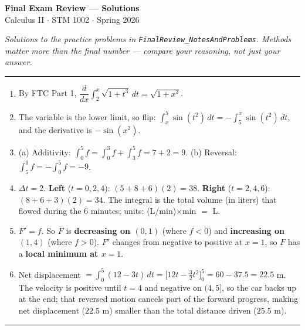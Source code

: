 \documentclass[11pt]{article}
\newcommand{\strand}[1]{%
  \vspace{0.7em}%
  \noindent{\large\textbf{\textcolor{secblue}{#1}}}\par\vspace{0.2em}%
  \noindent\rule{\textwidth}{0.3pt}\par%
}
\begin{document}
\begin{center}
{\LARGE \textbf{Final Exam Review --- Solutions}}\\[4pt]
{\large Calculus II $\cdot$ STM 1002 $\cdot$ Spring 2026}
\end{center}

\noindent\textit{Solutions to the practice problems in \texttt{FinalReview\_NotesAndProblems}. Methods matter more than the final number --- compare your reasoning, not just your answer.}

\strand{1.\quad Accumulation \& the FTC}

\begin{enumerate}[leftmargin=2em, itemsep=0.6em]
\item By FTC Part 1, $\dfrac{d}{dx}\displaystyle\int_2^{x}\sqrt{1+t^3}\,dt = \sqrt{1+x^3}$.

\item The variable is the lower limit, so flip: $\displaystyle\int_{x}^{5}\sin(t^2)\,dt = -\int_5^x \sin(t^2)\,dt$, and the derivative is $-\sin(x^2)$.

\item (a) Additivity: $\displaystyle\int_0^5 f = \int_0^3 f + \int_3^5 f = 7 + 2 = 9$. \;(b) Reversal: $\displaystyle\int_5^0 f = -\int_0^5 f = -9$.

\item $\Delta t = 2$. \;\textbf{Left} ($t=0,2,4$): $(5+8+6)(2) = 38$. \;\textbf{Right} ($t=2,4,6$): $(8+6+3)(2) = 34$. The integral is the total volume (in liters) that flowed during the 6 minutes; units: (L/min)$\times$min $=$ L.

\item $F' = f$. So $F$ is \textbf{decreasing on $(0,1)$} (where $f<0$) and \textbf{increasing on $(1,4)$} (where $f>0$). $F'$ changes from negative to positive at $x=1$, so $F$ has a \textbf{local minimum at $x=1$}.

\item Net displacement $=\displaystyle\int_0^5 (12 - 3t)\,dt = \bigl[12t - \tfrac32 t^2\bigr]_0^5 = 60 - 37.5 = \mathbf{22.5}$ m. The velocity is positive until $t=4$ and negative on $(4,5]$, so the car backs up at the end; that reversed motion cancels part of the forward progress, making net displacement ($22.5$ m) smaller than the total distance driven ($25.5$ m).
\end{enumerate}

\strand{2.\quad Antiderivatives \& Techniques}
\end{document}
